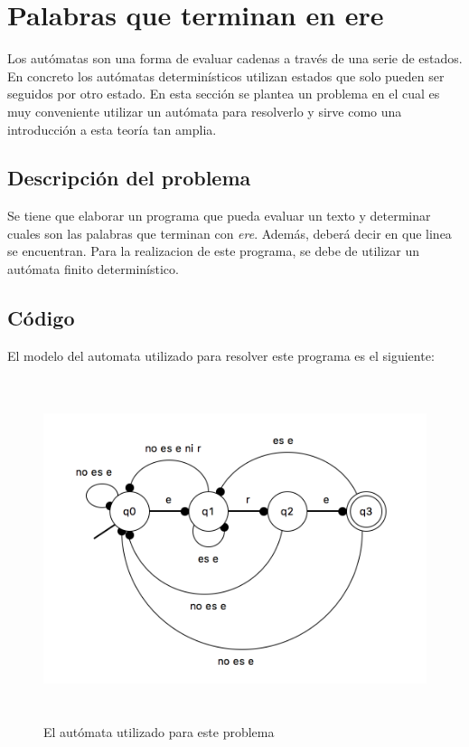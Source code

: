 \documentclass[12pt]{article}
\begin{document}
\newpage
\section{Palabras que terminan en ere}
Los autómatas son una forma de evaluar cadenas a través de una serie de estados. En concreto los autómatas determinísticos utilizan estados que solo pueden ser seguidos por otro estado. En esta sección se plantea un problema en el cual es muy conveniente utilizar un autómata para resolverlo y sirve como una introducción a esta teoría tan amplia.

\subsection{Descripción del problema}
Se tiene que elaborar un programa que pueda evaluar un texto y determinar cuales son las palabras que terminan con \textit{ere}. Además, deberá decir en que linea se encuentran. Para la realizacion de este programa, se debe de utilizar un autómata finito determinístico.


\subsection{Código}
El modelo del automata utilizado para resolver este programa es el siguiente:

\begin{figure}[H]
\includegraphics[width=\textwidth, height=10cm]{automata_ere}
\caption{El autómata utilizado para este problema}
\label{fig:modelo_automata_ere}
\end{figure}
\end{document}
